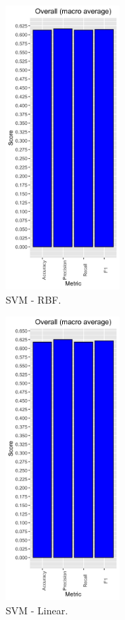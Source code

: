 \begin{figure}[H]
	\centering
	\begin{subfigure}[b]{0.3\textwidth}
		\includegraphics[width=4.25cm]{../images/svmRadial_performance.png}
		\caption{SVM - RBF.}
	\end{subfigure}
	\begin{subfigure}[b]{0.3\textwidth}
		\includegraphics[width=4.25cm]{../images/svmLinear_performance.png}
		\caption{SVM - Linear.}
	\end{subfigure}
	\begin{subfigure}[b]{0.3\textwidth}

\end{subfigure}
\end{figure}

